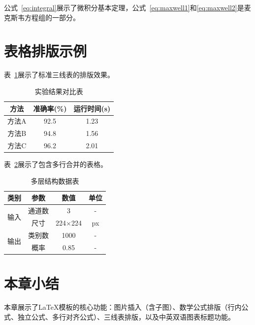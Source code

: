 公式~\eqref{eq:integral}展示了微积分基本定理，公式~\eqref{eq:maxwell1}和\eqref{eq:maxwell2}是麦克斯韦方程组的一部分。

\section{表格排版示例}

表~\ref{tab:three-line}展示了标准三线表的排版效果。

\begin{table}[htbp]
    \centering
    \caption{实验结果对比表}
    \label{tab:three-line}
    \begin{tabular}{ccc}
        \toprule
        \textbf{方法} & \textbf{准确率(\%)} & \textbf{运行时间(s)} \\
        \midrule
        方法A & 92.5 & 1.23 \\
        方法B & 94.8 & 1.56 \\
        方法C & 96.2 & 2.01 \\
        \bottomrule
    \end{tabular}
\end{table}

表~\ref{tab:multi-row}展示了包含多行合并的表格。

\begin{table}[htbp]
    \centering
    \caption{多层结构数据表}
    \label{tab:multi-row}
    \begin{tabular}{cccc}
        \toprule
        \textbf{类别} & \textbf{参数} & \textbf{数值} & \textbf{单位} \\
        \midrule
        \multirow{2}{*}{输入} & 通道数 & 3 & - \\
                              & 尺寸 & 224$\times$224 & px \\
        \midrule
        \multirow{2}{*}{输出} & 类别数 & 1000 & - \\
                              & 概率 & 0.85 & - \\
        \bottomrule
    \end{tabular}
\end{table}

\section{本章小结}

本章展示了LaTeX模板的核心功能：图片插入（含子图）、数学公式排版（行内公式、独立公式、多行对齐公式）、三线表排版，以及中英双语图表标题功能。
